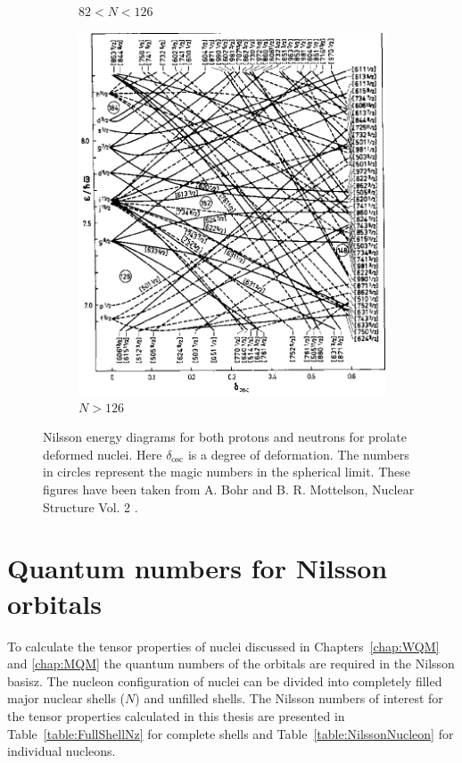 \documentclass[10pt,a4paper, twoside, openright]{report}
\begin{document}
\begin{figure}
\begin{subfigure}[b]{0.48\textwidth}
    \caption{$82<N<126$}
\end{subfigure}	
\quad
\begin{subfigure}[b]{0.48\textwidth}
    \includegraphics[width=\textwidth]{./figures/Nilsson/neutron_deformed126.png}
    \caption{$N>126$}
\end{subfigure}
\caption[Nilsson energy plots from Ref. \cite{BohrMottVol2}]{Nilsson energy diagrams for both protons and neutrons for prolate deformed nuclei. Here $\delta_{\text{osc}}$ is a degree of deformation. The numbers in circles represent the magic numbers in the spherical limit. These figures have been taken from A. Bohr and B. R. Mottelson, Nuclear Structure Vol. 2 \cite{BohrMottVol2}. \label{fig:NilssonPlots}}

\end{figure}
\section{Quantum numbers for Nilsson orbitals}
To calculate the tensor properties of nuclei discussed in Chapters~\ref{chap:WQM} and \ref{chap:MQM} the quantum numbers of the orbitals are required in the Nilsson basisz. The nucleon configuration of nuclei can be divided into completely filled major nuclear shells ($N$) and unfilled shells. The Nilsson numbers of interest for the tensor properties calculated in this thesis are presented in Table~\ref{table:FullShellNz} for complete shells and Table~\ref{table:NilssonNucleon} for individual nucleons.
\end{document}
